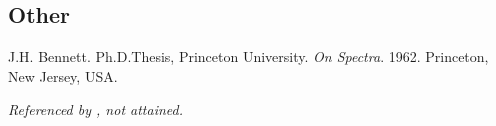 \begin{thebibliography}{9}
\backrefprint

\section*{Other}


J.H. Bennett. Ph.D.Thesis, Princeton University. \emph{On Spectra}. 1962.
Princeton, New Jersey, USA.

\emph{Referenced by \cite{cobham-1965}, not attained.}

\backrefprint

\end{thebibliography}
